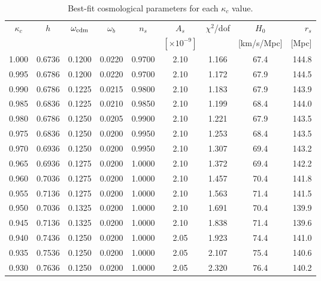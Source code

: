 \begin{table}
\centering
\caption{Best-fit cosmological parameters for each $\kappa_c$ value.}
\label{tab:bestfit}
\begin{tabular}{ccccccccr}
\hline
$\kappa_c$ & $h$ & $\omega_{\rm cdm}$ & $\omega_b$ & $n_s$ & $A_s$ & $\chi^2$/dof & $H_0$ & $r_s$ \\
 & & & & & $[\times 10^{-9}]$ & & [km/s/Mpc] & [Mpc] \\
\hline
1.000 & 0.6736 & 0.1200 & 0.0220 & 0.9700 & 2.10 & 1.166 & 67.4 & 144.8 \\
0.995 & 0.6786 & 0.1200 & 0.0220 & 0.9700 & 2.10 & 1.172 & 67.9 & 144.5 \\
0.990 & 0.6786 & 0.1225 & 0.0215 & 0.9800 & 2.10 & 1.183 & 67.9 & 143.9 \\
0.985 & 0.6836 & 0.1225 & 0.0210 & 0.9850 & 2.10 & 1.199 & 68.4 & 144.0 \\
0.980 & 0.6786 & 0.1250 & 0.0205 & 0.9900 & 2.10 & 1.221 & 67.9 & 143.5 \\
0.975 & 0.6836 & 0.1250 & 0.0200 & 0.9950 & 2.10 & 1.253 & 68.4 & 143.5 \\
0.970 & 0.6936 & 0.1250 & 0.0200 & 0.9950 & 2.10 & 1.307 & 69.4 & 143.2 \\
0.965 & 0.6936 & 0.1275 & 0.0200 & 1.0000 & 2.10 & 1.372 & 69.4 & 142.2 \\
0.960 & 0.7036 & 0.1275 & 0.0200 & 1.0000 & 2.10 & 1.457 & 70.4 & 141.8 \\
0.955 & 0.7136 & 0.1275 & 0.0200 & 1.0000 & 2.10 & 1.563 & 71.4 & 141.5 \\
0.950 & 0.7036 & 0.1325 & 0.0200 & 1.0000 & 2.10 & 1.691 & 70.4 & 139.9 \\
0.945 & 0.7136 & 0.1325 & 0.0200 & 1.0000 & 2.10 & 1.838 & 71.4 & 139.6 \\
0.940 & 0.7436 & 0.1250 & 0.0200 & 1.0000 & 2.05 & 1.923 & 74.4 & 141.0 \\
0.935 & 0.7536 & 0.1250 & 0.0200 & 1.0000 & 2.05 & 2.107 & 75.4 & 140.6 \\
0.930 & 0.7636 & 0.1250 & 0.0200 & 1.0000 & 2.05 & 2.320 & 76.4 & 140.2 \\
\hline
\end{tabular}
\end{table}